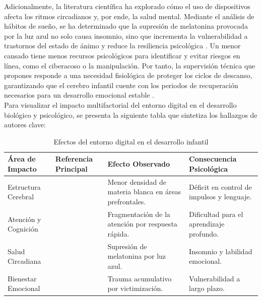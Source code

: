 Adicionalmente, la literatura científica ha explorado cómo el uso de dispositivos afecta los ritmos circadianos y, por ende, la salud mental. Mediante el análisis de hábitos de sueño, se ha determinado que la supresión de melatonina provocada por la luz azul no solo causa insomnio, sino que incrementa la vulnerabilidad a trastornos del estado de ánimo y reduce la resiliencia psicológica \cite{swider-cios_young_2023, page_psychological_2025}. Un menor cansado tiene menos recursos psicológicos para identificar y evitar riesgos en línea, como el ciberacoso o la manipulación. Por tanto, la supervisión técnica que propones responde a una necesidad fisiológica de proteger los ciclos de descanso, garantizando que el cerebro infantil cuente con los periodos de recuperación necesarios para un desarrollo emocional estable \cite{serra_smartphone_2021}. \\

Para visualizar el impacto multifactorial del entorno digital en el desarrollo biológico y psicológico, se presenta la siguiente tabla que sintetiza los hallazgos de autores clave:\\

\begin{table}[h!]
\centering
\caption{Efectos del entorno digital en el desarrollo infantil}
\begin{tabular}{|p{3.5cm}|p{4cm}|p{3.5cm}|p{3cm}|}
\hline
\textbf{Área de Impacto} & \textbf{Referencia Principal} & \textbf{Efecto Observado} & \textbf{Consecuencia Psicológica} \\ \hline
Estructura Cerebral & \cite{joseph_impact_2022, clemente-suarez_digital_2024} & Menor densidad de materia blanca en áreas prefrontales. & Déficit en control de impulsos y lenguaje. \\ \hline
Atención y Cognición & \cite{clemente-suarez_digital_2024, limone_psychological_2021} & Fragmentación de la atención por respuesta rápida. & Dificultad para el aprendizaje profundo. \\ \hline
Salud Circadiana & \cite{swider-cios_young_2023, serra_smartphone_2021} & Supresión de melatonina por luz azul. & Insomnio y labilidad emocional. \\ \hline
Bienestar Emocional & \cite{page_psychological_2025, borges_off_2025} & Trauma acumulativo por victimización. & Vulnerabilidad a largo plazo. \\ \hline
\end{tabular}
\end{table}

